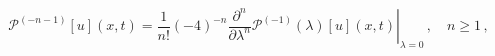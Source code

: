 \begin{equation*}
{\mathcal{P}}^{(-n-1)}[u](x,t) = \left.\frac{1}{{n}!}(-4)^{-{n}}
\frac{\partial^{{n}}}{\partial\lambda^{{n}}}
{\mathcal{P}}^{(-1)}(\lambda)[u](x,t)\right|_{\lambda=0}\,,\quad {n} \geq
1\,,
\end{equation*}

